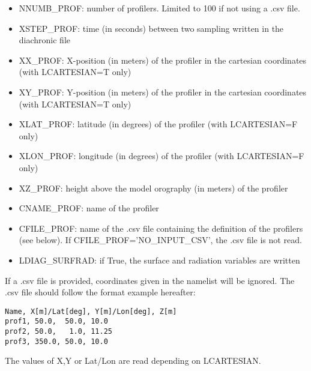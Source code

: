 \begin{itemize}
\item NNUMB\_PROF: number of profilers. Limited to 100 if not using a .csv file.

\item XSTEP\_PROF: time (in seconds) between two sampling written in the diachronic file

\item XX\_PROF: X-position (in meters) of the profiler in the cartesian coordinates (with LCARTESIAN=T only)

\item XY\_PROF: Y-position (in meters) of the profiler in the cartesian coordinates (with LCARTESIAN=T only)

\item XLAT\_PROF: latitude (in degrees) of the profiler (with LCARTESIAN=F only)

\item XLON\_PROF: longitude (in degrees) of the profiler (with LCARTESIAN=F only)

\item XZ\_PROF: height above the model orography (in meters) of the profiler

\item CNAME\_PROF: name of the profiler

\item CFILE\_PROF: name of the .csv file containing the definition of the profilers (see below). If CFILE\_PROF='NO\_INPUT\_CSV', the .csv file is not read.

\item LDIAG\_SURFRAD: if True, the surface and radiation variables are written

\end{itemize}

If a .csv file is provided, coordinates given in the namelist will be ignored. The .csv file should follow the format example hereafter:
\begin{verbatim}
Name, X[m]/Lat[deg], Y[m]/Lon[deg], Z[m]
prof1, 50.0,  50.0, 10.0
prof2, 50.0,   1.0, 11.25
prof3, 350.0, 50.0, 10.0
\end{verbatim}
The values of X,Y or Lat/Lon are read depending on LCARTESIAN.

